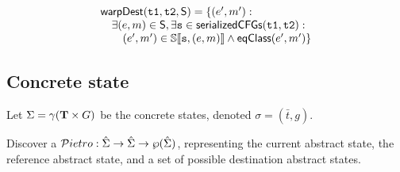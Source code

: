 \[
\begin{array}{l}
\mathsf{warpDest}(\mathtt{t1}, \mathtt{t2}, \mathsf{S}) =\{(e', m'):\\
\hspace{10pt} \exists (e, m) \in \mathsf{S}, \exists \mathtt{s} \in \mathsf{serializedCFGs}(\mathtt{t1}, \mathtt{t2}) :\\
\hspace{20pt} (e', m') \in \mathbb{S}\llbracket \mathtt{s}, (e, m) \rrbracket \land \mathsf{eqClass}(e', m')\}\\
\end{array}
\]


\newcommand\ts{\bar{t}}


\subsection{Concrete state}
Let $\Sigma = \gamma(\mathbf{T} \times G)$ be the concrete states, denoted $\sigma = (\ts,g)$.

\newcommand\Pietrot{{\cal P}ietro}

Discover a $\Pietrot : \hat{\Sigma} \rightarrow \hat{\Sigma}
\rightarrow \wp({\hat{\Sigma}})$, representing the current abstract
state, the reference abstract state, and a set of possible destination
abstract states.



